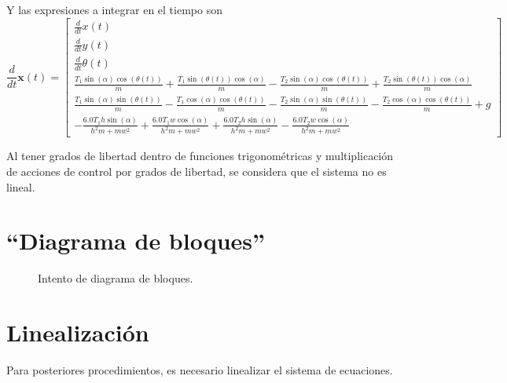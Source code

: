 \documentclass[titlepage, letterpaper]{article}
\begin{document}
Y las expresiones a integrar en el tiempo son
\begin{equation*}\frac{d}{d t} \pmb{x}{\left(t \right)} = \left[\begin{matrix}\frac{d}{d t} x{\left(t \right)}\\\frac{d}{d t} y{\left(t \right)}\\\frac{d}{d t} \theta{\left(t \right)}\\\frac{T_{1} \sin{\left(\alpha \right)} \cos{\left(\theta{\left(t \right)} \right)}}{m} + \frac{T_{1} \sin{\left(\theta{\left(t \right)} \right)} \cos{\left(\alpha \right)}}{m} - \frac{T_{2} \sin{\left(\alpha \right)} \cos{\left(\theta{\left(t \right)} \right)}}{m} + \frac{T_{2} \sin{\left(\theta{\left(t \right)} \right)} \cos{\left(\alpha \right)}}{m}\\\frac{T_{1} \sin{\left(\alpha \right)} \sin{\left(\theta{\left(t \right)} \right)}}{m} - \frac{T_{1} \cos{\left(\alpha \right)} \cos{\left(\theta{\left(t \right)} \right)}}{m} - \frac{T_{2} \sin{\left(\alpha \right)} \sin{\left(\theta{\left(t \right)} \right)}}{m} - \frac{T_{2} \cos{\left(\alpha \right)} \cos{\left(\theta{\left(t \right)} \right)}}{m} + g\\- \frac{6.0 T_{1} h \sin{\left(\alpha \right)}}{h^{2} m + m w^{2}} + \frac{6.0 T_{1} w \cos{\left(\alpha \right)}}{h^{2} m + m w^{2}} + \frac{6.0 T_{2} h \sin{\left(\alpha \right)}}{h^{2} m + m w^{2}} - \frac{6.0 T_{2} w \cos{\left(\alpha \right)}}{h^{2} m + m w^{2}}\end{matrix}\right]\end{equation*}

Al tener grados de libertad dentro de funciones trigonométricas y multiplicación de acciones de control por grados de libertad, se considera que el sistema no es lineal.

\section{“Diagrama de bloques”}

\begin{figure}[H]
	\centering
	
	\caption{Intento de diagrama de bloques.}
\end{figure}

\section{Linealización}

Para posteriores procedimientos, es necesario linealizar el sistema de ecuaciones.
\end{document}
